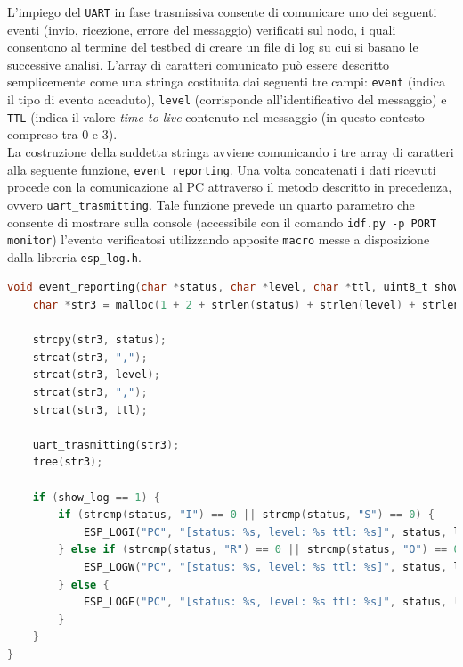 \noindent L'impiego del \texttt{UART} in fase trasmissiva consente di comunicare uno dei seguenti eventi (invio, ricezione, errore del messaggio) verificati sul nodo, i quali consentono al termine del testbed di creare un file di log su cui si basano le successive analisi. L'array di caratteri comunicato può essere descritto semplicemente come una stringa costituita dai seguenti tre campi: \texttt{event} (indica il tipo di evento accaduto), \texttt{level} (corrisponde all'identificativo del messaggio) e \texttt{TTL} (indica il valore \textit{time-to-live} contenuto nel messaggio (in questo contesto compreso tra 0 e 3).\\
La costruzione della suddetta stringa avviene comunicando i tre array di caratteri alla seguente funzione, \texttt{event\_reporting}. Una volta concatenati i dati ricevuti procede con la comunicazione al PC attraverso il metodo descritto in precedenza, ovvero \texttt{uart\_trasmitting}. Tale funzione prevede un quarto parametro che consente di mostrare sulla console (accessibile con il comando \texttt{idf.py -p PORT monitor}) l'evento verificatosi utilizzando apposite \texttt{macro} messe a disposizione dalla libreria \texttt{esp\_log.h}.

\begin{lstlisting}[language=C, caption= costruzione stringa da inviare al PC tramite \texttt{uart\_trasmitting}]
void event_reporting(char *status, char *level, char *ttl, uint8_t show_log) {
    char *str3 = malloc(1 + 2 + strlen(status) + strlen(level) + strlen(status));// 1 end char; 2 for comma

    strcpy(str3, status);
    strcat(str3, ",");
    strcat(str3, level);
    strcat(str3, ",");
    strcat(str3, ttl);

    uart_trasmitting(str3);
    free(str3);

    if (show_log == 1) {
        if (strcmp(status, "I") == 0 || strcmp(status, "S") == 0) {
            ESP_LOGI("PC", "[status: %s, level: %s ttl: %s]", status, level, ttl);
        } else if (strcmp(status, "R") == 0 || strcmp(status, "O") == 0) {
            ESP_LOGW("PC", "[status: %s, level: %s ttl: %s]", status, level, ttl);
        } else {
            ESP_LOGE("PC", "[status: %s, level: %s ttl: %s]", status, level, ttl);
        }
    }
}
\end{lstlisting}

